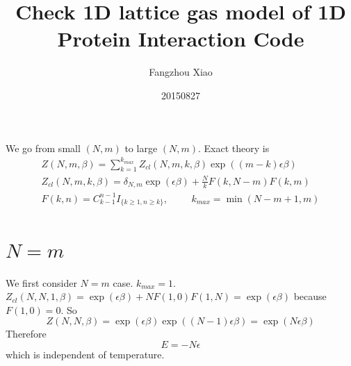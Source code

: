 \documentclass[12pt]{article}
\title{Check 1D lattice gas model of 1D Protein Interaction Code}
\author{Fangzhou Xiao}
\date{20150827}
\begin{document}
	\maketitle
	\onehalfspacing

We go from small \((N,m)\) to large \((N,m)\). Exact theory is 
\begin{gather}
Z(N,m,\beta) = \sum_{k=1}^{k_{max}} Z_{cl}(N,m,k,\beta) \exp((m-k) \epsilon \beta)\\
Z_{cl}(N,m,k,\beta)= \delta_{N,m} \exp(\epsilon \beta) + \frac N k F(k, N-m)F(k,m)\\
F(k,n)=C^{n-1}_{k-1} I_{\{k\geq 1, n \geq k\}}, \hspace{1cm} k_{max} = \min(N-m+1, m)
\end{gather}

\section{\(N=m\)}

We first consider \(N=m\) case. \(k_{max} = 1\). 
\(Z_{cl}(N,N,1,\beta) = \exp (\epsilon \beta) + N F(1,0) F(1,N) = \exp (\epsilon \beta ) \) because \(F(1,0) = 0\). So 
\[
Z(N,N,\beta) = \exp(\epsilon \beta) \exp((N-1) \epsilon \beta)
= \exp(N \epsilon \beta)
\]
Therefore
\[
E = -N\epsilon 
\]
which is independent of temperature. 
\end{document}
